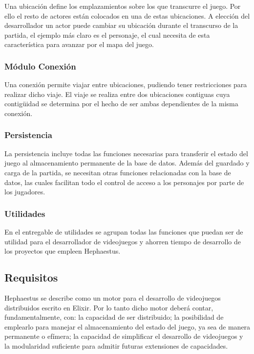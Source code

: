 Una ubicación define los emplazamientos sobre los que transcurre el juego. Por ello el resto de actores están colocados en una de estas ubicaciones. A elección del desarrollador un actor puede cambiar su ubicación durante el transcurso de la partida, el ejemplo más claro es el personaje, el cual necesita de esta característica para avanzar por el mapa del juego.

\subsubsection{Módulo Conexión}

Una conexión permite viajar entre ubicaciones, pudiendo tener restricciones para realizar dicho viaje. El viaje se realiza entre dos ubicaciones contiguas cuya contigüidad se determina por el hecho de ser ambas dependientes de la misma conexión.

\subsubsection{Persistencia}

La persistencia incluye todas las funciones necesarias para transferir el estado del juego al almacenamiento permanente de la base de datos. Además del guardado y carga de la partida, se necesitan otras funciones relacionadas con la base de datos, las cuales facilitan todo el control de acceso a los personajes por parte de los jugadores.

\subsubsection{Utilidades}

En el entregable de utilidades se agrupan todas las funciones que puedan ser de utilidad para el desarrollador de videojuegos y ahorren tiempo de desarrollo de los proyectos que empleen Hephaestus.

\subsection{Requisitos}

Hephaestus se describe como un motor para el desarrollo de videojuegos distribuidos escrito en Elixir. Por lo tanto dicho motor deberá contar, fundamentalmente, con: la capacidad de ser distribuido; la posibilidad de emplearlo para manejar el almacenamiento del estado del juego, ya sea de manera permanente o efímera; la capacidad de simplificar el desarrollo de videojuegos y la modularidad suficiente para admitir futuras extensiones de capacidades.


